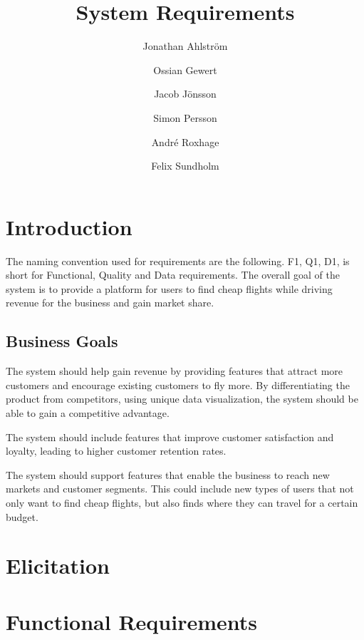 \documentclass[a4paper]{article}
\title{System Requirements}
\author{Jonathan Ahlström \and Ossian Gewert \and Jacob Jönsson \and Simon Persson \and André Roxhage \and Felix Sundholm}
\begin{document}
\maketitle

\begin{center}
    
\end{center}

\newpage
\tableofcontents
\newpage

\section{Introduction}
The naming convention used for requirements are the following. F1, Q1, D1, is short for Functional, Quality and Data requirements.
The overall goal of the system is to provide a platform for users to find cheap flights while driving revenue for the business and gain market share.

\subsection{Business Goals}
The system should help gain revenue by providing features that attract more customers and encourage existing customers to fly more. By differentiating the product from competitors, using unique data visualization, the system should be able to gain a competitive advantage.

The system should include features that improve customer satisfaction and loyalty, leading to higher customer retention rates.

The system should support features that enable the business to reach new markets and customer segments. This could include new types of users that not only want to find cheap flights, but also finds where they can travel for a certain budget.

\section{Elicitation}


\section{Functional Requirements}

\end{document}
